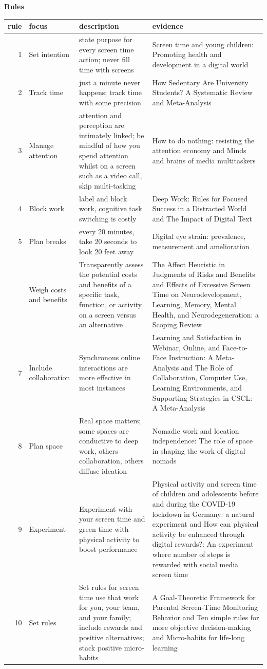 \documentclass[
]{book}
\begin{document}
\textbf{Rules}

\begin{tabular}{rlll}
\toprule
rule & focus & description & evidence\\
\midrule
1 & Set intention & state purpose for every screen time action; never fill time with screens & Screen time and young children: Promoting health and development in a digital world\\
2 & Track time & just a minute never happens; track time with some precision & How Sedentary Are University Students? A Systematic Review and Meta-Analysis\\
3 & Manage attention & attention and perception are intimately linked; be mindful of how you spend attention whilst on a screen such as a video call, skip multi-tasking & How to do nothing: resisting the attention economy and Minds and brains of media multitaskers\\
4 & Block work & label and block work, cognitive task switching is costly & Deep Work: Rules for Focused Success in a Distracted World and The Impact of Digital Text\\
5 & Plan breaks & every 20 minutes, take 20 seconds to look 20 feet away & Digital eye strain: prevalence, measurement and amelioration\\
\addlinespace
6 & Weigh costs and benefits & Transparently assess the potential costs and benefits of a specific task, function, or activity on a screen versus an alternative & The Affect Heuristic in Judgments of Risks and Benefits and Effects of Excessive Screen Time on Neurodevelopment, Learning, Memory, Mental Health, and Neurodegeneration: a Scoping Review\\
7 & Include collaboration & Synchronous online interactions are more effective in most instances & Learning and Satisfaction in Webinar, Online, and Face-to-Face Instruction: A Meta-Analysis and The Role of Collaboration, Computer Use, Learning Environments, and Supporting Strategies in CSCL: A Meta-Analysis\\
8 & Plan space & Real space matters; some spaces are conductive to deep work, others collaboration, others diffuse ideation & Nomadic work and location independence: The role of space in shaping the work of digital nomads\\
9 & Experiment & Experiment with your screen time and green time with physical activity to boost performance & Physical activity and screen time of children and adolescents before and during the COVID-19 lockdown in Germany: a natural experiment and How can physical activity be enhanced through digital rewards?: An experiment where number of steps is rewarded with social media screen time\\
10 & Set rules & Set rules for screen time use that work for you, your team, and your family; include rewards and positive alternatives; stack positive micro-habits & A Goal-Theoretic Framework for Parental Screen-Time Monitoring Behavior and Ten simple rules for more objective decision-making and Micro-habits for life-long learning\\
\bottomrule
\end{tabular}
\end{document}
